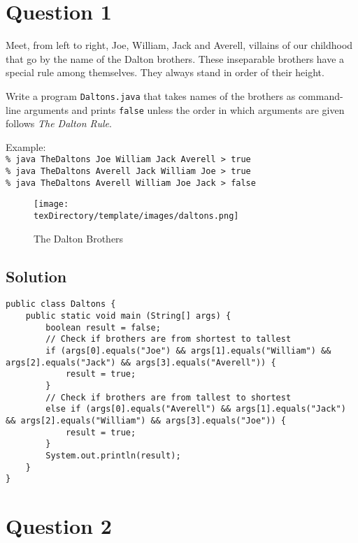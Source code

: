 \documentclass[12pt,letterpaper,twoside]{article}
\begin{document}


\section*{Question 1}

Meet, from left to right, Joe, William, Jack and Averell, villains of our childhood that go by the name of the Dalton brothers. These inseparable brothers have a special rule among themselves. They always stand in order of their height.

Write a program \texttt{Daltons.java} that takes names of the brothers as command-line arguments and prints \texttt{false} unless the order in which arguments are given follows \textit{The Dalton Rule}.

Example:\\
\texttt{\% java TheDaltons Joe William Jack Averell > true}\\
\texttt{\% java TheDaltons Averell Jack William Joe > true}\\
\texttt{\% java TheDaltons Averell William Joe Jack > false}
\begin{figure}[H]\centering
\texttt{[image: \\texDirectory/template/images/daltons.png]}
\caption{The Dalton Brothers}\label{fig1}
\end{figure}

\subsection*{Solution}

\lstset{language=Java}
\begin{lstlisting}
public class Daltons {
	public static void main (String[] args) {
		boolean result = false;
		// Check if brothers are from shortest to tallest
		if (args[0].equals("Joe") && args[1].equals("William") && args[2].equals("Jack") && args[3].equals("Averell")) {
			result = true;
		}
		// Check if brothers are from tallest to shortest
		else if (args[0].equals("Averell") && args[1].equals("Jack") && args[2].equals("William") && args[3].equals("Joe")) {
			result = true;
		}
		System.out.println(result);
	}
}
\end{lstlisting}

\section*{Question 2}
\end{document}
